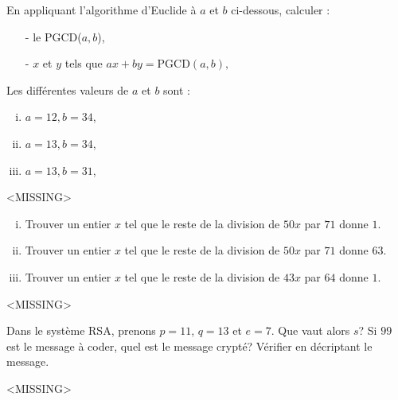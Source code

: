 
\vspace*{0.8cm}
\begin{exo}
En appliquant l'algorithme d'Euclide \`a $a$ et $b$ ci-dessous, calculer :
\begin{itemize}
\item[-] le PGCD($a,b$),
\item[-] $x$ et $y$ tels que $ ax + by = \text{PGCD}(a,b),$
\end{itemize}
Les diff\'erentes valeurs de $a$ et $b$ sont :
\begin{enumerate}[(i)]
\item $a = 12, b = 34$,
\item $a = 13, b = 34$,
\item $a = 13, b = 31$,
\end{enumerate}
\end{exo}

<MISSING>

\newpage

\vspace*{0.8cm}
\begin{exo} 
\begin{enumerate}[(i)]
\item Trouver un entier $x$ tel que le reste de la division de $50x$ par $71$ donne $1$.
\item Trouver un entier $x$ tel que le reste de la division de $50x$ par $71$ donne $63$.
\item Trouver un entier $x$ tel que le reste de la division de $43x$ par $64$ donne $1$.
\end{enumerate}
\end{exo}

<MISSING>


\vspace*{0.8cm}
\begin{exo}
Dans le syst\`eme RSA, prenons $p=11$, $q=13$ et $e=7$. Que vaut alors $s$? Si $99$ est le message \`a coder, quel est le message crypt\'e? V\'erifier en d\'ecriptant le message.
\end{exo}

<MISSING>

\thispagestyle{empty}